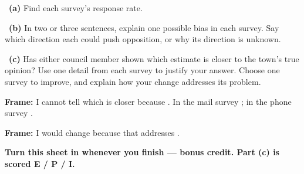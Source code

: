 \documentclass[11pt]{article}
\begin{document}
~\textbf{(a)} Find each survey's response rate.\par
\workspace{0.8in}

~\textbf{(b)} In two or three sentences, explain one possible bias in each survey. Say which direction each could push opposition, or why its direction is unknown.\par
\workspace{1.4in}

~\textbf{(c)} Has either council member shown which estimate is closer to the town's true opinion? Use one detail from each survey to justify your answer. Choose one survey to improve, and explain how your change addresses its problem.\par
\workspace{2.0in}

\begin{sentenceframebox}\raggedright\textbf{Frame:} I cannot tell which is closer because \blank[1.7in]. In the mail survey \blank[1.8in]; in the phone survey \blank[1.8in].\end{sentenceframebox}

\begin{sentenceframebox}\raggedright\textbf{Frame:} I would change \blank[1.8in] because that addresses \blank[1.8in].\end{sentenceframebox}

\textbf{Turn this sheet in whenever you finish --- bonus credit. Part (c) is scored E / P / I.}\par
\end{document}
